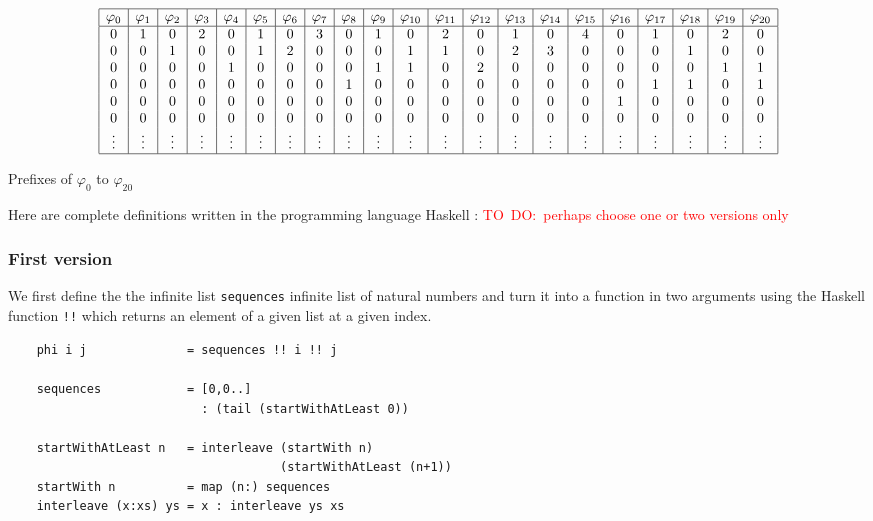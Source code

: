 \documentclass[envcountsame]{llncs}
\newcommand{\todo}[1]{\textcolor{red}{TO~DO:~#1}}
\begin{document}
\noindent
\begin{table}\label{tab:phi}
\[\begin{array}{|c|c|c|c|c|c|c|c|c|c|c|c|c|c|c|c|c|c|c|c|c|}
\hline
\varphi_{0} & \varphi_{1} & \varphi_{2} & \varphi_{3} & \varphi_{4} & \varphi_{5} & \varphi_{6} & \varphi_{7} & \varphi_{8} & \varphi_{9} & \varphi_{10} & \varphi_{11} & \varphi_{12} & \varphi_{13} & \varphi_{14} & \varphi_{15} & \varphi_{16} & \varphi_{17} & \varphi_{18} & \varphi_{19} & \varphi_{20}\\
\hline
0 & 1 & 0 & 2 & 0 & 1 & 0 & 3 & 0 & 1 & 0 & 2 & 0 & 1 & 0 & 4 & 0 & 1 & 0 & 2 & 0\\
0 & 0 & 1 & 0 & 0 & 1 & 2 & 0 & 0 & 0 & 1 & 1 & 0 & 2 & 3 & 0 & 0 & 0 & 1 & 0 & 0\\
0 & 0 & 0 & 0 & 1 & 0 & 0 & 0 & 0 & 1 & 1 & 0 & 2 & 0 & 0 & 0 & 0 & 0 & 0 & 1 & 1\\
0 & 0 & 0 & 0 & 0 & 0 & 0 & 0 & 1 & 0 & 0 & 0 & 0 & 0 & 0 & 0 & 0 & 1 & 1 & 0 & 1\\
0 & 0 & 0 & 0 & 0 & 0 & 0 & 0 & 0 & 0 & 0 & 0 & 0 & 0 & 0 & 0 & 1 & 0 & 0 & 0 & 0\\
0 & 0 & 0 & 0 & 0 & 0 & 0 & 0 & 0 & 0 & 0 & 0 & 0 & 0 & 0 & 0 & 0 & 0 & 0 & 0 & 0\\
\vdots & \vdots & \vdots & \vdots & \vdots & \vdots & \vdots & \vdots & \vdots & \vdots & \vdots & \vdots & \vdots & \vdots & \vdots & \vdots & \vdots & \vdots & \vdots & \vdots & \vdots\\
\hline
\end{array}\]
\caption{Prefixes of $\varphi_0$ to $\varphi_{20}$}
\end{table}

Here are complete definitions written in the programming language Haskell : \todo{perhaps choose one or two  versions only}



\subsubsection{First version}
We first define the the infinite list \texttt{sequences} infinite list of natural numbers and turn it into a function in two arguments using the Haskell function \verb+!!+ which returns an element of a given list at a given index.
\begin{verbatim}
    phi i j              = sequences !! i !! j

    sequences            = [0,0..]
                           : (tail (startWithAtLeast 0))

    startWithAtLeast n   = interleave (startWith n)
                                      (startWithAtLeast (n+1))
    startWith n          = map (n:) sequences
    interleave (x:xs) ys = x : interleave ys xs
\end{verbatim}
\end{document}
